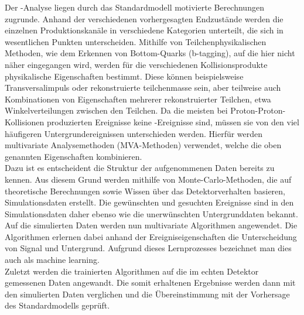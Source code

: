 Der \ttH-Analyse liegen durch das Standardmodell motivierte Berechnungen zugrunde. Anhand der verschiedenen vorhergesagten Endzust\"ande werden die einzelnen Produktionskan\"ale in verschiedene Kategorien unterteilt, die sich in wesentlichen Punkten unterscheiden. Mithilfe von Teilchenphysikalischen Methoden, wie dem Erkennen von Bottom-Quarks (b-tagging), auf die hier nicht n\"aher eingegangen wird, werden f\"ur die verschiedenen Kollisionsprodukte physikalische Eigenschaften bestimmt. Diese k\"onnen beispielsweise Transversalimpuls oder rekonstruierte teilchenmasse sein, aber teilweise auch Kombinationen von Eigenschaften mehrerer rekonstruierter Teilchen, etwa Winkelverteilungen zwischen den Teilchen. Da die meisten bei Proton-Proton-Kollisionen produzierten Ereignisse keine \ttH-Ereignisse sind, m\"ussen sie von den viel h\"aufigeren Untergrundereignissen unterschieden werden. Hierf\"ur werden multivariate Analysemethoden (MVA-Methoden) verwendet, welche die oben genannten Eigenschaften kombinieren.\\
Dazu ist es entscheident die Struktur der aufgenommenen Daten bereits zu kennen. Aus diesem Grund werden mithilfe von Monte-Carlo-Methoden, die auf theoretische Berechnungen sowie Wissen \"uber das Detektorverhalten basieren, Simulationsdaten erstellt. Die gew\"unschten und gesuchten Ereignisse sind in den Simulationsdaten daher ebenso wie die unerw\"unschten Untergrunddaten bekannt.\\%
Auf die simulierten Daten werden nun multivariate Algorithmen angewendet. Die Algorithmen erlernen dabei anhand der Ereigniseigenschaften die Unterscheidung von Signal und Untergrund. Aufgrund dieses Lernprozesses bezeichnet man dies auch als machine learning.\\
Zuletzt werden die trainierten Algorithmen auf die im echten Detektor gemessenen Daten angewandt. Die somit erhaltenen Ergebnisse werden dann mit den simulierten Daten verglichen und die \"Ubereinstimmung mit der Vorhersage des Standardmodells gepr\"uft.
